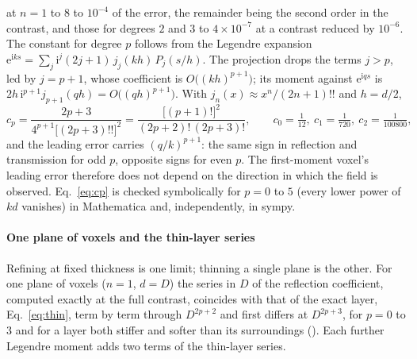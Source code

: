 \documentclass[preprint,review,12pt]{elsarticle}
\begin{document}
at $n=1$ to $8$ to $10^{-4}$ of the error, the remainder being the second order in the contrast, and
those for degrees $2$ and $3$ to $4\times10^{-7}$ at a contrast reduced by $10^{-6}$. The constant for
degree $p$ follows from the Legendre expansion
$\mathrm{e}^{\mathrm{i}ks}=\sum_j\mathrm{i}^j(2j+1)\,j_j(kh)\,P_j(s/h)$. The projection drops the terms
$j>p$, led by $j=p+1$, whose coefficient is $O\bigl((kh)^{p+1}\bigr)$; its moment against
$\mathrm{e}^{\mathrm{i}qs}$ is $2h\,\mathrm{i}^{p+1}j_{p+1}(qh)=O\bigl((qh)^{p+1}\bigr)$. With
$j_n(x)\approx x^n/(2n+1)!!$ and $h=d/2$,
\begin{equation}\label{eq:cp}
  c_p=\frac{2p+3}{4^{p+1}\bigl[(2p+3)!!\bigr]^2}=\frac{\bigl[(p+1)!\bigr]^2}{(2p+2)!\,(2p+3)!},
  \qquad c_0=\tfrac1{12},\ c_1=\tfrac1{720},\ c_2=\tfrac1{100800},
\end{equation}
and the leading error carries $(q/k)^{p+1}$: the same sign in reflection and transmission for odd
$p$, opposite signs for even $p$. The first-moment voxel's leading error therefore does not depend on
the direction in which the field is observed. Eq.~\eqref{eq:cp} is checked symbolically for $p=0$ to
$5$ (every lower power of $kd$ vanishes) in Mathematica and, independently, in sympy.

\paragraph{One plane of voxels and the thin-layer series} Refining at fixed thickness is one limit;
thinning a single plane is the other. For one plane of voxels ($n=1$, $d=D$) the series in $D$ of the
reflection coefficient, computed exactly at the full contrast, coincides with that of the exact layer,
Eq.~\eqref{eq:thin}, term by term through $D^{2p+2}$ and first differs at $D^{2p+3}$, for $p=0$ to $3$
and for a layer both stiffer and softer than its surroundings ().
Each further Legendre moment adds two terms of the thin-layer series.
\end{document}
